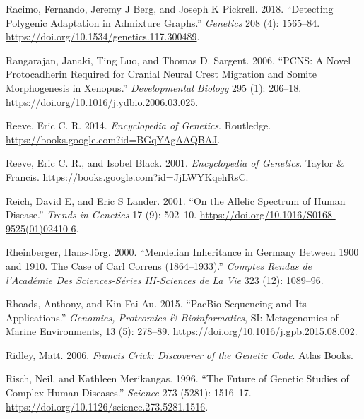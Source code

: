 \documentclass[
]{book}
\newlength{\cslhangindent}
\newlength{\cslentryspacingunit} %
\newenvironment{CSLReferences}[2] %
 {%
  \setlength{\parindent}{0pt}
  \ifodd #1
  \let\oldpar\par
  \def\par{\hangindent=\cslhangindent\oldpar}
  \fi
  \setlength{\parskip}{#2\cslentryspacingunit}
 }%
 {}
\begin{document}
\begin{CSLReferences}{1}{0}
\leavevmode{}%
Racimo, Fernando, Jeremy J Berg, and Joseph K Pickrell. 2018. {``Detecting {Polygenic Adaptation} in {Admixture Graphs}.''} \emph{Genetics} 208 (4): 1565--84. \url{https://doi.org/10.1534/genetics.117.300489}.

\leavevmode{}%
Rangarajan, Janaki, Ting Luo, and Thomas D. Sargent. 2006. {``{PCNS}: {A} Novel Protocadherin Required for Cranial Neural Crest Migration and Somite Morphogenesis in {Xenopus}.''} \emph{Developmental Biology} 295 (1): 206--18. \url{https://doi.org/10.1016/j.ydbio.2006.03.025}.

\leavevmode{}%
Reeve, Eric C. R. 2014. \emph{Encyclopedia of {Genetics}}. {Routledge}. \url{https://books.google.com?id=BGqYAgAAQBAJ}.

\leavevmode{}%
Reeve, Eric C. R., and Isobel Black. 2001. \emph{Encyclopedia of {Genetics}}. {Taylor \& Francis}. \url{https://books.google.com?id=JjLWYKqehRsC}.

\leavevmode{}%
Reich, David E, and Eric S Lander. 2001. {``On the Allelic Spectrum of Human Disease.''} \emph{Trends in Genetics} 17 (9): 502--10. \url{https://doi.org/10.1016/S0168-9525(01)02410-6}.

\leavevmode{}%
Rheinberger, Hans-Jörg. 2000. {``Mendelian Inheritance in {Germany} Between 1900 and 1910. {The} Case of {Carl Correns} (1864--1933).''} \emph{Comptes Rendus de l'Académie Des Sciences-Séries III-Sciences de La Vie} 323 (12): 1089--96.

\leavevmode{}%
Rhoads, Anthony, and Kin Fai Au. 2015. {``{PacBio Sequencing} and {Its Applications}.''} \emph{Genomics, Proteomics \& Bioinformatics}, {SI}: {Metagenomics} of {Marine Environments}, 13 (5): 278--89. \url{https://doi.org/10.1016/j.gpb.2015.08.002}.

\leavevmode{}%
Ridley, Matt. 2006. \emph{Francis {Crick}: Discoverer of the Genetic Code}. {Atlas Books}.

\leavevmode{}%
Risch, Neil, and Kathleen Merikangas. 1996. {``The {Future} of {Genetic Studies} of {Complex Human Diseases}.''} \emph{Science} 273 (5281): 1516--17. \url{https://doi.org/10.1126/science.273.5281.1516}.


\end{CSLReferences}
\end{document}
